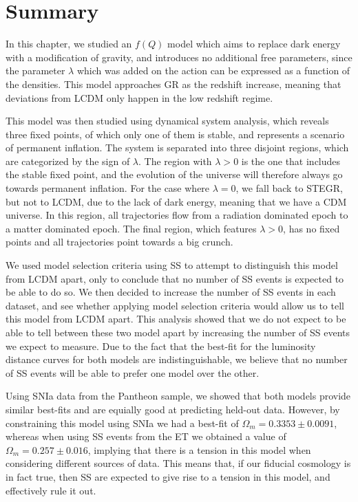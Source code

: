\section{Summary}
\label{sec:STG-dark-energy-summary}

In this chapter, we studied an $f(Q)$ model which aims to replace dark energy with a modification of gravity, and introduces no additional free parameters, since the parameter $\lambda$ which was added on the action can be expressed as a function of the densities. This model approaches \gls{GR} as the redshift increase, meaning that deviations from \gls{LCDM} only happen in the low redshift regime.

This model was then studied using dynamical system analysis, which reveals three fixed points, of which only one of them is stable, and represents a scenario of permanent inflation. The system is separated into three disjoint regions, which are categorized by the sign of $\lambda$. The region with $\lambda > 0$ is the one that includes the stable fixed point, and the evolution of the universe will therefore always go towards permanent inflation. For the case where $\lambda = 0$, we fall back to \gls{STEGR}, but not to \gls{LCDM}, due to the lack of dark energy, meaning that we have a \gls{CDM} universe. In this region, all trajectories flow from a radiation dominated epoch to a matter dominated epoch. The final region, which features $\lambda > 0$, has no fixed points and all trajectories point towards a big crunch.

We used model selection criteria using \gls{SS} to attempt to distinguish this model from \gls{LCDM} apart, only to conclude that no number of \gls{SS} events is expected to be able to do so. We then decided to increase the number of \gls{SS} events in each dataset, and see whether applying model selection criteria would allow us to tell this model from \gls{LCDM} apart. This analysis showed that we do not expect to be able to tell between these two model apart by increasing the number of \gls{SS} events we expect to measure. Due to the fact that the best-fit for the luminosity distance curves for both models are indistinguishable, we believe that no number of \gls{SS} events will be able to prefer one model over the other.

Using \gls{SNIa} data from the Pantheon sample, we showed that both models provide similar best-fits and are equially good at predicting held-out data. However, by constraining this model using \gls{SNIa} we had a best-fit of $\Omega_m = 0.3353 \pm 0.0091$, whereas when using \gls{SS} events from the \gls{ET} we obtained a value of $\Omega_m = 0.257 \pm 0.016$, implying that there is a tension in this model when considering different sources of data. This means that, if our fiducial cosmology is in fact true, then \gls{SS} are expected to give rise to a tension in this model, and effectively rule it out.
